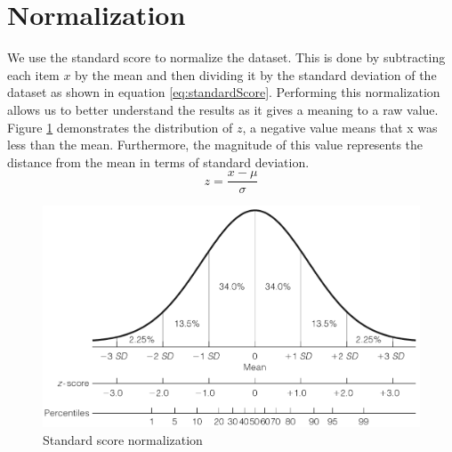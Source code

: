 \documentclass{mproj}
\begin{document}
\section{Normalization}
We use the standard score \cite{normalization} to normalize the dataset. This is done by subtracting each item $x$ by the mean and then dividing it by the standard deviation of the dataset as shown in equation \ref{eq:standardScore}. Performing this normalization allows us to better understand the results as it gives a meaning to a raw value. Figure \ref{fig:zscore} demonstrates the distribution of $z$, a negative value means that x was less than the mean. Furthermore, the magnitude of this value represents the distance from the mean in terms of standard deviation.
\begin{equation}
\label{eq:standardScore}
z= \frac{x - \mu}{\sigma}
\end{equation}
\begin{figure}[H]
\caption{Standard score normalization \cite{normalization}}
\label{fig:zscore}
\centerline{\includegraphics[scale=0.4]{zscore}}
\end{figure}
\end{document}
